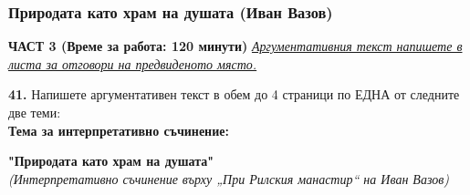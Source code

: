 \documentclass[12pt,a4paper]{article}
\begin{document}
\subsubsection{Природата като храм на душата (Иван Вазов)}
\vspace{0.5cm}
\begin{center}
\textbf{ЧАСТ 3 (Време за работа: 120 минути)}
\vspace{0.2cm}
{\textit{\underline{Аргументативния текст напишете в листа за отговори на предвиденото място.}}}
\vspace{0.1cm}
\end{center}
\textbf{41.} Напишете аргументативен текст в обем до 4 страници по ЕДНА от следните две теми:
\\
\vspace{0.2cm}
\textbf{Тема за интерпретативно съчинение:}
\vspace{0.1cm}
\begin{center}
\textbf{"Природата като храм на душата"}
\\
\textit{(Интерпретативно съчинение върху „При Рилския манастир“ на Иван Вазов)}
\end{center}
\end{document}
